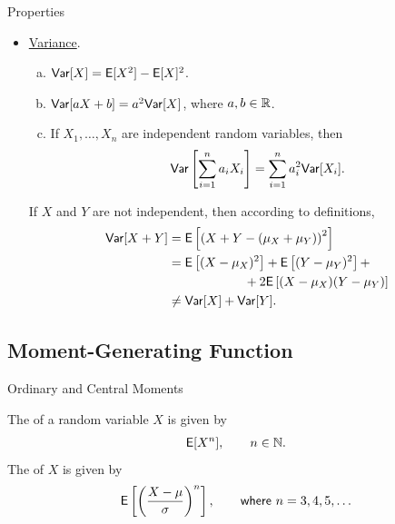 \begin{frame}{Properties}

\begin{itemize}
	\justifying
	\item \underline{Variance}.
	\begin{enumerate}[(a).]
		\justifying
		\item $\mathsf{Var}[X] = \mathsf{E}[X^2] - \mathsf{E}[X]^2$.
		\item $\mathsf{Var}[aX + b] = a^2\mathsf{Var}[X]$, where $a, b \in \mathbb{R}$.
		\item If $X_1, \ldots, X_n$ are independent random variables, then 
		\begin{align*}
		\mathsf{Var}\left[\sum_{i=1}^n a_iX_i \right]  = \sum_{i=1}^n a_i^2\mathsf{Var}[X_i].
		\end{align*}
	\end{enumerate}
	 If $X$ and $Y$ are not independent, then according to definitions,
	\begin{align*}
	\mathsf{Var}[X + Y] & = \mathsf{E}\left[\left(X + Y - (\mu_X + \mu_Y) \right)^2 \right] \\
	& = \mathsf{E}\left[(X-\mu_X)^2 \right] + \mathsf{E}\left[(Y - \mu_Y)^2 \right] + \\
	& \qquad \qquad \qquad + 2\mathsf{E}\left[(X-\mu_X)(Y-\mu_Y) \right] \\
	& \neq \mathsf{Var}[X] + \mathsf{Var}[Y].
	\end{align*}
\end{itemize}


\end{frame}


\subsection{Moment-Generating Function}

\begin{frame}{Ordinary and Central Moments}

\justifying
{} The  of a random variable $X$ is given by
\begin{align*}
\mathsf{E}[X^n], \qquad n\in \mathbb{N}.
\end{align*}
The  of $X$ is given by
\begin{align*}
\mathsf{E}\left[\left(\frac{X-\mu}{\sigma} \right)^n \right], \qquad \mathsf{where\ } n = 3, 4, 5, \ldots
\end{align*}

\end{frame}

